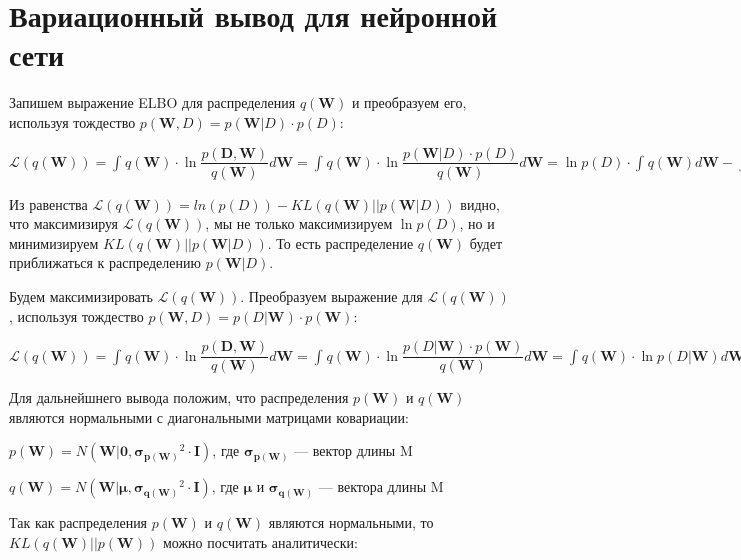 \documentclass{article}
\begin{document}
\section{Вариационный вывод для нейронной сети}
Запишем выражение ELBO для распределения $q(\mathbf{W})$ и преобразуем его, используя тождество $p(\mathbf{W}, D) = p(\mathbf{W}| D)\cdot p(D)$:

$
\mathcal{L}(q(\mathbf{W})) =
\int_{}{} q(\mathbf{W}) \cdot \ln{\dfrac{p(\mathbf{D}, \mathbf{W})}{q(\mathbf{W})}} d\mathbf{W} =
\int_{}{} q(\mathbf{W}) \cdot \ln{\dfrac{p(\mathbf{W}| D) \cdot p(D)}{q(\mathbf{W})}} d\mathbf{W} =
\ln{p(D)} \cdot \int_{}{} q(\mathbf{W}) d\mathbf{W} - \int_{}{} q(\mathbf{W})\cdot \ln{\dfrac{q(\mathbf{W})}{p(\mathbf{W}| D)}} d\mathbf{W} =
\ln{p(D)} - KL(q(\mathbf{W}) || p(\mathbf{W}| D))
$

Из равенства $\mathcal{L}(q(\mathbf{W})) = ln(p(D)) - KL(q(\mathbf{W}) || p(\mathbf{W}| D))$ видно, что максимизируя $\mathcal{L}(q(\mathbf{W}))$, мы не только максимизируем $\ln {p(D)}$, но и минимизируем $KL(q(\mathbf{W}) || p(\mathbf{W}| D))$. То есть распределение $q(\mathbf{W})$ будет приближаться к распределению $p(\mathbf{W}| D)$.

Будем максимизировать $\mathcal{L}(q(\mathbf{W}))$. Преобразуем выражение для $\mathcal{L}(q(\mathbf{W}))$, используя тождество
$p(\mathbf{W}, D) = p(D | \mathbf{W}) \cdot p(\mathbf{W})$:

$
\mathcal{L}(q(\mathbf{W})) =
\int_{}{} q(\mathbf{W}) \cdot \ln{\dfrac{p(\mathbf{D}, \mathbf{W})}{q(\mathbf{W})}} d\mathbf{W} =
\int_{}{} q(\mathbf{W}) \cdot \ln{\dfrac{p(D | \mathbf{W}) \cdot p(\mathbf{W})}{q(\mathbf{W})}} d\mathbf{W} =
\int_{}{} q(\mathbf{W}) \cdot \ln{p(D | \mathbf{W})} d\mathbf{W} - \int_{}{} q(\mathbf{W}) \cdot \ln{\dfrac{q(\mathbf{W})}{p(\mathbf{W})}} =
\int_{}{} q(\mathbf{W}) \cdot \ln{p(D | \mathbf{W})} d\mathbf{W} - KL(q(\mathbf{W}) || p(\mathbf{W}))
$

Для дальнейшнего вывода положим, что распределения $p(\mathbf{W})$ и $q(\mathbf{W})$ являются нормальными с диагональными матрицами ковариации:

$p(\mathbf{W}) = N(\mathbf{W} | \mathbf{0}, \pmb{\sigma_{p(\mathbf{W})}}^{2} \cdot \mathbf{I})$, где $\pmb{\sigma_{p(\mathbf{W})}}$ — вектор длины M

$q(\mathbf{W}) = N(\mathbf{W} | \pmb{\mu}, \pmb{\sigma_{q(\mathbf{W})}}^{2} \cdot \mathbf{I})$, где $\pmb{\mu}$ и $\pmb{\sigma_{q(\mathbf{W})}}$ — вектора длины M

Так как распределения $p(\mathbf{W})$ и $q(\mathbf{W})$ являются нормальными, то $KL(q(\mathbf{W}) || p(\mathbf{W}))$ можно посчитать аналитически:
\end{document}
